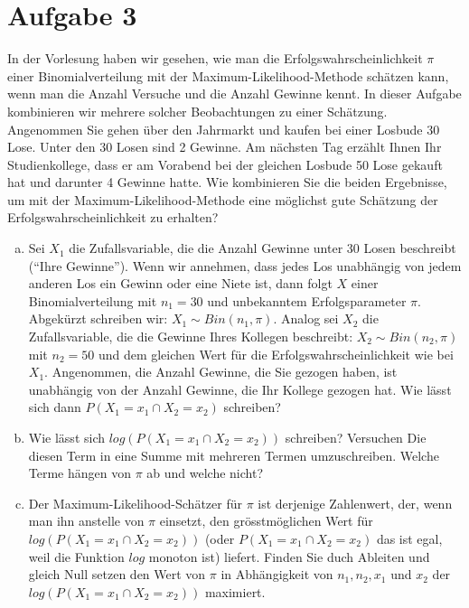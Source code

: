 \section{Aufgabe 3}
In der Vorlesung haben wir gesehen, wie man die Erfolgswahrscheinlichkeit
$\pi$ einer Binomialverteilung mit der Maximum-Likelihood-Methode schätzen 
kann, wenn man die Anzahl Versuche und die Anzahl Gewinne kennt. In dieser 
Aufgabe kombinieren wir mehrere solcher Beobachtungen zu einer Schätzung.
Angenommen Sie gehen über den Jahrmarkt und kaufen bei einer Losbude 30 Lose. 
Unter den 30 Losen sind 2 Gewinne. Am nächsten Tag erzählt Ihnen Ihr 
Studienkollege, dass er am Vorabend bei der gleichen Losbude 50 Lose gekauft
hat und darunter 4 Gewinne hatte. Wie kombinieren Sie die beiden Ergebnisse, 
um mit der Maximum-Likelihood-Methode eine möglichst gute Schätzung der 
Erfolgswahrscheinlichkeit zu erhalten?

\begin{enumerate}[(a)]
\item Sei $X_1$ die Zufallsvariable, die die Anzahl Gewinne unter 30 Losen 
beschreibt (``Ihre Gewinne''). Wenn wir annehmen, dass jedes Los 
unabhängig von jedem anderen Los ein Gewinn oder eine Niete ist, dann folgt
$X$ einer Binomialverteilung mit $n_1 = 30$ und unbekanntem Erfolgsparameter
$\pi$. Abgekürzt schreiben wir: $X_1 \sim Bin(n_1,\pi)$.
Analog sei $X_2$ die Zufallsvariable, die die Gewinne Ihres Kollegen 
beschreibt: $X_2 \sim Bin(n_2,\pi)$ mit $n_2=50$ und dem gleichen Wert für
die Erfolgswahrscheinlichkeit wie bei $X_1$.
Angenommen, die Anzahl Gewinne, die Sie gezogen haben, ist unabhängig von der
Anzahl Gewinne, die Ihr Kollege gezogen hat.
Wie lässt sich dann $P(X_1=x_1 \cap X_2=x_2)$ schreiben?
\item Wie lässt sich $log(P(X_1=x_1 \cap X_2=x_2))$ schreiben?
Versuchen Die diesen Term in eine Summe mit mehreren Termen umzuschreiben.
Welche Terme hängen von $\pi$ ab und welche nicht?
\item Der Maximum-Likelihood-Schätzer für $\pi$ ist derjenige Zahlenwert,
der, wenn man ihn anstelle von $\pi$ einsetzt, den grösstmöglichen Wert für
$log(P(X_1=x_1 \cap X_2=x_2))$ (oder $P(X_1=x_1 \cap X_2=x_2)$ das ist egal,
weil die Funktion $log$ monoton ist) liefert.
Finden Sie duch Ableiten und gleich Null setzen den Wert von $\pi$ in 
Abhängigkeit von $n_1, n_2, x_1$ und $x_2$ der $log(P(X_1=x_1 \cap X_2=x_2))$
maximiert.
\end{enumerate}


